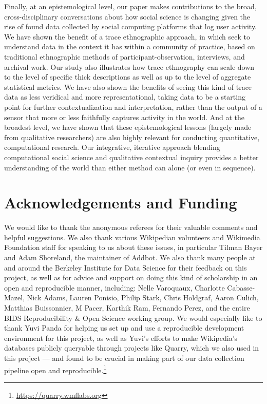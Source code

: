 \documentclass[format=acmsmall, review=false, screen=true]{acmart}%
\begin{document}
Finally, at an epistemological level, our paper makes contributions to the broad, cross-disciplinary conversations about how social science is changing given the rise of found data collected by social computing platforms that log user activity. We have shown the benefit of a trace ethnographic approach, in which seek to understand data in the context it has within a community of practice, based on traditional ethnographic methods of participant-observation, interviews, and archival work. Our study also illustrates how trace ethnography can scale down to the level of specific thick descriptions as well as up to the level of aggregate statistical metrics. We have also shown the benefits of seeing this kind of trace data as less veridical and more representational, taking data to be a starting point for further contextualization and interpretation, rather than the output of a sensor that more or less faithfully captures activity in the world. And at the broadest level, we have shown that these epistemological lessons (largely made from qualitative researchers) are also highly relevant for conducting quantitative, computational research. Our integrative, iterative approach blending computational social science and qualitative contextual inquiry provides a better understanding of the world than either method can alone (or even in sequence).

\section*{Acknowledgements and Funding}
We would like to thank the anonymous referees for their valuable comments and helpful suggestions. We also thank various Wikipedian volunteers and Wikimedia Foundation staff for speaking to us about these issues, in particular Tilman Bayer and Adam Shoreland, the maintainer of Addbot. We also thank many people at and around the Berkeley Institute for Data Science for their feedback on this project, as well as for advice and support on doing this kind of scholarship in an open and reproducible manner, including: Nelle Varoquaux, Charlotte Cabasse-Mazel, Nick Adams, Lauren Ponisio, Philip Stark, Chris Holdgraf, Aaron Culich, Matthias Buissonnier, M Pacer, Karthik Ram, Fernando Perez, and the entire BIDS Reproducibility \& Open Science working group. We would especially like to thank Yuvi Panda for helping us set up and use a reproducible development environment for this project, as well as Yuvi's efforts to make Wikipedia's databases publicly queryable through projects like Quarry, which we also used in this project --- and found to be crucial in making part of our data collection pipeline open and reproducible.\footnote{ \url{https://quarry.wmflabs.org}}
\end{document}
